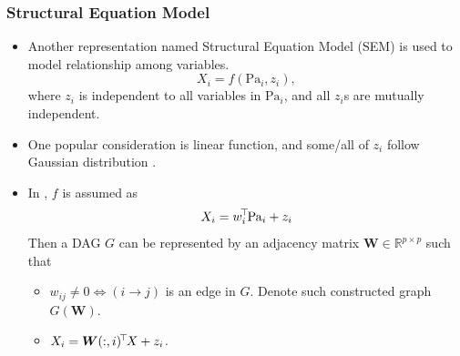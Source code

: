 \documentclass[10pt,xcolor={usenames,dvipsnames,table}]{beamer}
\begin{document}
\begin{frame}
    \frametitle{Structural Equation Model}
    \begin{itemize}
        \item Another representation named Structural Equation Model (SEM) is used to model relationship among variables.
    \[
    X_i = f(\text{Pa}_i, z_i),
    \] 
    where $z_i$ is independent to all variables in $\text{Pa}_i$, and all $z_i$s are mutually independent.
    \item One popular consideration is linear  function, and some/all of $z_i$ follow Gaussian distribution \citep{loh2014high,van2013ell_}.

    \item In \citep{zheng2018dags}, $f$ is assumed as
        \[
        X_i = w_i^{\!\top\!} \text{Pa}_i + z_i
        \] 
        Then a DAG $G$ can be represented by an adjacency matrix  $\bm{W} \in \mathbb{R}^{p \times p}$ such that
        \begin{itemize}
            \item $w_{ij} \neq 0 \Leftrightarrow (i \rightarrow j)$ is an edge in $G$. Denote such constructed graph $G(\bm{W})$.
            \item  $X_i = \bm{W}(:,i)^{\!\top\!}X + z_i$.
        \end{itemize}

    \end{itemize}


\end{frame}
\end{document}
